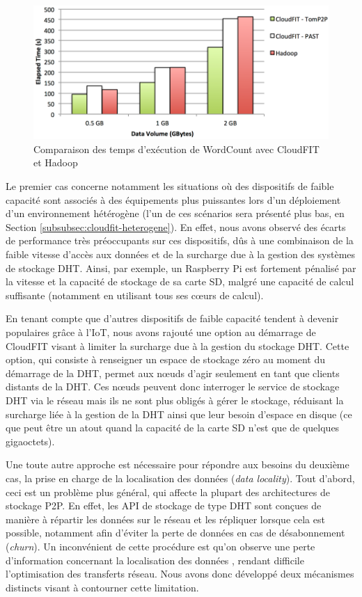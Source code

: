 \begin{figure}[!ht]
	\centering
	\includegraphics[width=0.65\linewidth]{img/CloudFIT-mesures.pdf}
	\caption{Comparaison des temps d'exécution de WordCount avec CloudFIT et Hadoop}
	\label{fig:Hadoop}
\end{figure}

Le premier cas concerne notamment les situations où des dispositifs de faible capacité sont associés à des équipements plus puissantes lors d'un déploiement d'un environnement hétérogène (l'un de ces scénarios sera présenté plus bas, en Section \ref{subsubsec:cloudfit-heterogene}). En effet, nous avons observé des écarts de performance très préoccupants sur ces dispositifs, dûs à une combinaison de la faible vitesse d'accès aux données et de la surcharge due à la gestion des systèmes de stockage DHT. Ainsi, par exemple, un Raspberry Pi est fortement pénalisé par la vitesse et la capacité de stockage de sa carte SD, malgré une capacité de calcul suffisante (notamment en utilisant tous ses c{\oe}urs de calcul). 

En tenant compte que d'autres dispositifs de faible capacité tendent à devenir populaires grâce à l'IoT, nous avons rajouté une option au démarrage de CloudFIT visant à limiter la surcharge due à la gestion du stockage DHT. Cette option, qui consiste à renseigner un espace de stockage zéro au moment du démarrage de la DHT, permet aux n{\oe}uds d'agir seulement en tant que clients distants de la DHT. Ces n{\oe}uds peuvent donc interroger le service de stockage DHT via le réseau mais ils ne sont plus obligés à gérer le stockage, réduisant la surcharge liée à la gestion de la DHT ainsi que leur besoin d'espace en disque (ce que peut être un atout quand la capacité de la carte SD n'est que de quelques gigaoctets).

Une toute autre approche est nécessaire pour répondre aux besoins du deuxième cas, la prise en charge de la localisation des données (\textit{data locality}). Tout d'abord, ceci est un problème plus général, qui affecte la plupart des architectures de stockage P2P. En effet, les API de stockage de type DHT sont conçues de manière à répartir les données sur le réseau et les répliquer lorsque cela est possible, notamment afin d'éviter la perte de données en cas de désabonnement (\textit{churn}). Un inconvénient de cette procédure est qu'on observe une perte d'information concernant la localisation des données \cite{Wu2005}, rendant difficile l'optimisation des transferts réseau. Nous avons donc développé deux mécanismes distincts visant à contourner cette limitation. 

